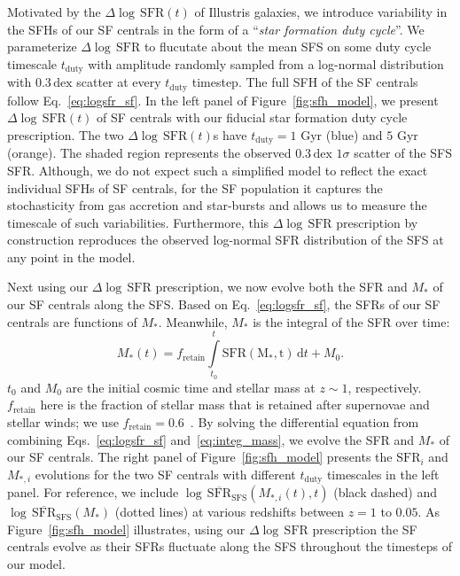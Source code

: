 \documentclass[12pt, letterpaper, preprint]{aastex}
\newcommand{\beq}{\begin{equation}}
\newcommand{\eeq}{\end{equation}}
\newcommand{\logsfr}{\log \, \mathrm{SFR}}
\newcommand{\musfms}{\log\,\overline{\mathrm{SFR}}_\mathrm{SFS}}
\begin{document}
Motivated by the $\Delta \logsfr(t)$ of Illustris galaxies, we introduce 
variability in the SFHs of our SF centrals in the form of a ``\emph{star 
formation duty cycle}''. We parameterize $\Delta \logsfr$ to flucutate about 
the mean SFS on some duty cycle timescale $t_\mathrm{duty}$ with amplitude
randomly sampled from a log-normal distribution with $0.3\,\mathrm{dex}$ 
scatter at every $t_\mathrm{duty}$ timestep. The full SFH of the SF 
centrals follow Eq.~\ref{eq:logsfr_sf}.
In the left panel of Figure~\ref{fig:sfh_model}, we 
present $\Delta \logsfr(t)$ of SF centrals with our fiducial star formation 
duty cycle prescription. The two $\Delta \logsfr(t)$s have $t_\mathrm{duty}=1$ 
Gyr (blue) and $5$ Gyr (orange). The shaded region represents the observed 
$0.3\,\mathrm{dex}$ $1\sigma$ scatter of the SFS SFR. 
Although, we do not expect such a simplified model to reflect the exact 
individual SFHs of SF centrals, for the SF population it captures the 
stochasticity from gas accretion and star-bursts and allows us to measure
the timescale of such variabilities. Furthermore, this $\Delta \logsfr$ 
prescription by construction reproduces the observed log-normal SFR 
distribution of the SFS at any point in the model. 

Next using our $\Delta \logsfr$ prescription, we now evolve both the 
SFR and $M_*$ of our SF centrals along the SFS. Based on Eq.~\ref{eq:logsfr_sf},
the SFRs of our SF centrals are functions of $M_*$. Meanwhile, $M_*$ 
is the integral of the SFR over time: 
\beq \label{eq:integ_mass} 
M_*(t) = f_\mathrm{retain} \int\limits_{t_0}^{t} \mathrm{SFR(M_*, t)}\,\mathrm{d}t + M_0. 
\eeq
$t_0$ and $M_0$ are the initial cosmic time and stellar mass at $z \sim 1$, 
respectively. $f_\mathrm{retain}$ here is the fraction of stellar mass 
that is retained after supernovae and stellar winds; we use $f_\mathrm{retain} = 0.6$~\citep{wetzel2013}. 
By solving the differential equation from combining Eqs.~\ref{eq:logsfr_sf} 
and~\ref{eq:integ_mass}, we evolve the SFR and $M_*$ of our SF centrals.  
The right panel of Figure~\ref{fig:sfh_model} presents the $\mathrm{SFR}_i$ 
and $M_{*,i}$ evolutions for the two SF centrals with different 
$t_\mathrm{duty}$ timescales in the left panel. For reference, we include 
$\musfms(M_{*,i}(t), t)$ (black dashed) and $\musfms(M_*)$ 
(dotted lines) at various redshifts between $z = 1$ to $0.05$. As 
Figure~\ref{fig:sfh_model} illustrates, using our $\Delta \logsfr$ 
prescription the SF centrals evolve as their SFRs fluctuate along the SFS 
throughout the timesteps of our model. 
\end{document}
